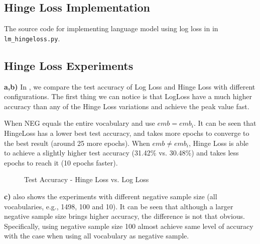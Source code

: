 \documentclass{article}
\begin{document}
\subsection{Hinge Loss Implementation}
The source code for implementing language model using log loss in in \texttt{lm\_hingeloss.py}. 

\subsection{Hinge Loss Experiments}

\textbf{a,b)}
In , we compare the test accuracy of Log Loss and Hinge Loss with different configurations. The first thing we can notice is that LogLoss have a much higher accuracy than any of the Hinge Loss variations and achieve the peak value fast.

When NEG equals the entire vocabulary and use $emb = emb_i$. It can be seen that HingeLoss has a lower best test accuracy, and takes more epochs to converge to the best result (around 25 more epochs). When $emb \neq emb_i$, Hinge Loss is able to achieve a slightly higher test accuracy (31.42\% vs. 30.48\%) and takes less epochs to reach it (10 epochs faster).

\begin{figure}
\centering
{}
\caption{Test Accuracy - Hinge Loss vs. Log Loss}
\label{fig:hinge_log}
\end{figure}

\textbf{c)}  also shows the experiments with different negative sample size (all vocabularies, e.g., 1498, 100 and 10). It can be seen that although a larger negative sample size brings higher accuracy, the difference is not that obvious. Specifically, using negative sample size 100 almost achieve same level of accuracy with the case when using all vocabulary as negative sample.
\end{document}
